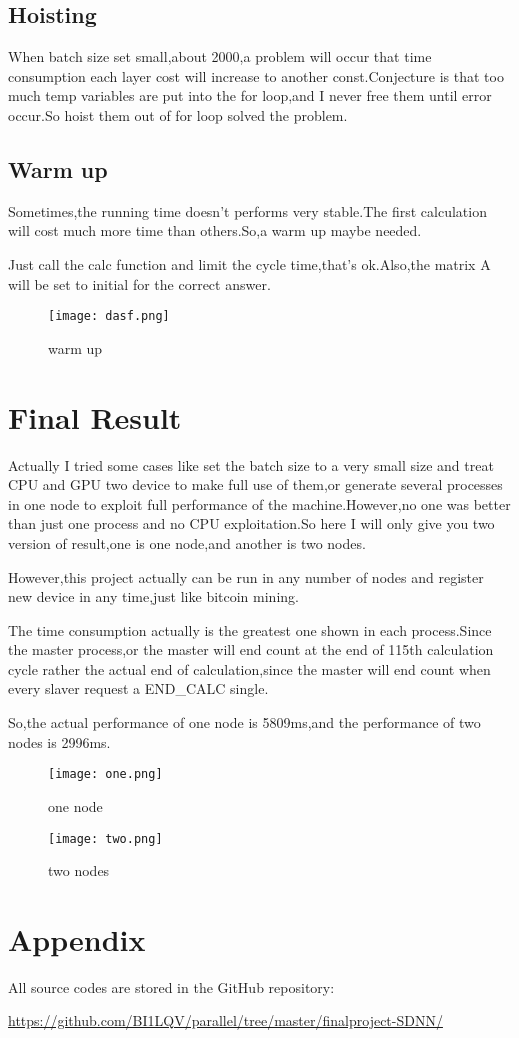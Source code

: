 \documentclass[12pt]{scrartcl} %
\begin{document}
\subsection{Hoisting}
When batch size set small,about 2000,a problem will occur that time consumption each layer cost will increase to another const.Conjecture is that too much temp variables are put into the for loop,and I never free them until error occur.So hoist them out of for loop solved the problem.
\subsection{Warm up}
Sometimes,the running time doesn't performs very stable.The first calculation will cost much more time than others.So,a warm up maybe needed.

Just call the calc function and limit the cycle time,that's ok.Also,the matrix A will be set to initial for the correct answer.
\begin{figure}[H]
    \centering
    \texttt{[image: dasf.png]}
    \caption{warm up}
\end{figure}
\section{Final Result}
Actually I tried some cases like set the batch size to a very small size and treat CPU and GPU two device to make full use of them,or generate several processes in one node to exploit full performance of the machine.However,no one was better than just one process and no CPU exploitation.So here I will only give you two version of result,one is one node,and another is two nodes.

However,this project actually can be run in any number of nodes and register new device in any time,just like bitcoin mining.

The time consumption actually is the greatest one shown in each process.Since the master process,or the master will end count at the end of 115th calculation cycle rather the actual end of calculation,since the master will end count when every slaver request a END\_CALC single.

So,the actual performance of one node is 5809ms,and the performance of two nodes is 2996ms.
\begin{figure}[H]
    \centering
    \texttt{[image: one.png]}
    \caption{one node}
    \label{}
\end{figure}
\begin{figure}[H]
    \centering
    \texttt{[image: two.png]}
    \caption{two nodes}
    \label{}
\end{figure}
\section{Appendix}
All source codes are stored in the GitHub repository:


\url{https://github.com/BI1LQV/parallel/tree/master/finalproject-SDNN/}
\end{document}
